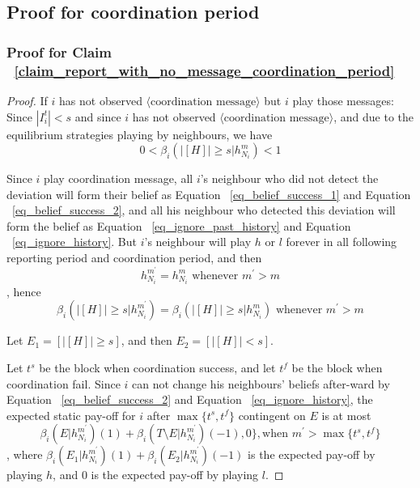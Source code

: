 \documentclass[12pt]{article}
\theoremstyle{remark}
\theoremstyle{remark}
\begin{document}
\subsection{Proof for coordination period}






\subsubsection{Proof for Claim ~\ref{claim_report_with_no_message_coordination_period}}

\begin{proof}




If $i$ has not observed $\langle \text{coordination message} \rangle$ but $i$ play those messages: Since $|I^t_i|<s$ and since $i$ has not observed $\langle \text{coordination message} \rangle$, and due to the equilibrium strategies playing by neighbours, we have 
\[0<\beta_{i}(|[H]|\geq s|h^{m}_{N_i})<1\]

Since $i$ play coordination message, all $i$'s neighbour who did not detect the deviation will form their belief as Equation ~\ref{eq_belief_success_1} and Equation ~\ref{eq_belief_success_2}, and all his neighbour who detected this deviation will form the belief as Equation ~\ref{eq_ignore_past_history} and Equation ~\ref{eq_ignore_history}. But $i$'s neighbour will play $h$ or $l$ forever in all following reporting period and coordination period, and then 
\[h^{m^{'}}_{N_i}=h^{m}_{N_i} \text{ whenever } m^{'}>m\]
, hence 
\[\beta_{i}(|[H]|\geq s|h^{m^{'}}_{N_i})=\beta_{i}(|[H]|\geq s|h^{m}_{N_i}) \text{ whenever } m^{'}>m\]

Let $E_1=[|[H]|\geq s]$, and then $E_2=[|[H]|< s]$.



Let $t^{s}$ be the block when coordination success, and let $t^{f}$ be the block when coordination fail. Since $i$ can not change his neighbours' beliefs after-ward by Equation ~\ref{eq_belief_success_2} and Equation ~\ref{eq_ignore_history}, the expected static pay-off for $i$ after $\max\{t^s,t^f\}$ contingent on $E$ is at most 
\begin{equation}
{\beta_{i}(E|h^{m^{'}}_{N_i})(1)+\beta_{i}(T\setminus E|h^{m^{'}}_{N_i})(-1),0\}, \text{when } m^{'}> \max\{t^s,t^f\}}
\end{equation}
, where $\beta_{i}(E_1|h^{m^{'}}_{N_i})(1)+\beta_{i}(E_2|h^{m^{'}}_{N_i})(-1)$ is the expected pay-off by playing $h$, and $0$ is the expected pay-off by playing $l$.


\end{proof}
\end{document}
